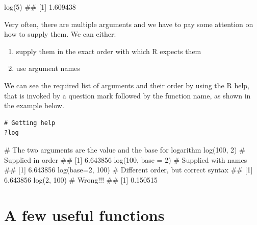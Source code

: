 \documentclass[a4paper,12pt,oneside]{book}
\providecommand{\tightlist}{%
  \setlength{\itemsep}{0pt}\setlength{\parskip}{0pt}}
\newenvironment{Shaded}{\begin{snugshade}}{\end{snugshade}}
\newcommand{\DecValTok}[1]{#1}
\newcommand{\CommentTok}[1]{#1}
\newcommand{\DocumentationTok}[1]{#1}
\newcommand{\FunctionTok}[1]{#1}
\newcommand{\AttributeTok}[1]{#1}
\newcommand{\NormalTok}[1]{#1}
\begin{document}
\begin{Shaded}
\begin{Highlighting}[]
\FunctionTok{log}\NormalTok{(}\DecValTok{5}\NormalTok{)}
\DocumentationTok{\#\# [1] 1.609438}
\end{Highlighting}
\end{Shaded}

Very often, there are multiple arguments and we have to pay some attention on how to supply them. We can either:

\begin{enumerate}
\def\labelenumi{\arabic{enumi}.}
\tightlist
\item
  supply them in the exact order with which R expects them
\item
  use argument names
\end{enumerate}

We can see the required list of arguments and their order by using the R help, that is invoked by a question mark followed by the function name, as shown in the example below.

\begin{verbatim}
# Getting help
?log 
\end{verbatim}

\begin{Shaded}
\begin{Highlighting}[]
\CommentTok{\# The two arguments are the value and the base for logarithm}
\FunctionTok{log}\NormalTok{(}\DecValTok{100}\NormalTok{, }\DecValTok{2}\NormalTok{) }\CommentTok{\# Supplied in order}
\DocumentationTok{\#\# [1] 6.643856}
\FunctionTok{log}\NormalTok{(}\DecValTok{100}\NormalTok{, }\AttributeTok{base =} \DecValTok{2}\NormalTok{) }\CommentTok{\# Supplied with names}
\DocumentationTok{\#\# [1] 6.643856}
\FunctionTok{log}\NormalTok{(}\AttributeTok{base=}\DecValTok{2}\NormalTok{, }\DecValTok{100}\NormalTok{) }\CommentTok{\# Different order, but correct syntax}
\DocumentationTok{\#\# [1] 6.643856}
\FunctionTok{log}\NormalTok{(}\DecValTok{2}\NormalTok{, }\DecValTok{100}\NormalTok{) }\CommentTok{\# Wrong!!!}
\DocumentationTok{\#\# [1] 0.150515}
\end{Highlighting}
\end{Shaded}

\hypertarget{a-few-useful-functions}{%
\section{A few useful functions}\label{a-few-useful-functions}}
\end{document}
